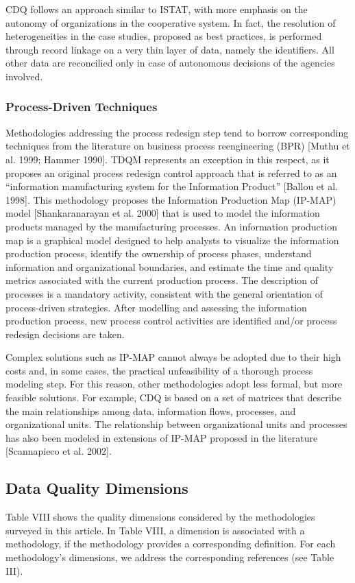\documentclass[pdftex,english,oribibl]{llncs}
\begin{document}
    CDQ follows an approach similar to ISTAT, with more emphasis on the autonomy of organizations in the cooperative system.
    In fact, the resolution of heterogeneities in the case studies, proposed as best practices, is performed through record linkage on a very thin layer of data, namely the identifiers.
    All other data are reconcilied only in case of autonomous decisions of the agencies involved.
    \subsubsection{Process-Driven Techniques}
    Methodologies addressing the process redesign step tend to borrow corresponding techniques from the literature on business process reengineering (BPR) [Muthu et al. 1999; Hammer 1990].
    TDQM represents an exception in this respect, as it proposes an original process redesign control approach that is referred to as an “information manufacturing system for the Information Product” [Ballou et al. 1998].
    This methodology proposes the Information Production Map (IP-MAP) model [Shankaranarayan et al. 2000] that is used to model the information products managed by the manufacturing processes.
    An information production map is a graphical model designed to help analysts to visualize the information production process, identify the ownership of process phases, understand information and organizational boundaries, and estimate the time and quality metrics associated with the current production process.
    The description of processes is a mandatory activity, consistent with the general orientation of process-driven strategies.
    After modelling and assessing the information production process, new process control activities are identified and/or process redesign decisions are taken.

    Complex solutions such as IP-MAP cannot always be adopted due to their high costs and, in some cases, the practical unfeasibility of a thorough process modeling step.
    For this reason, other methodologies adopt less formal, but more feasible solutions.
    For example, CDQ is based on a set of matrices that describe the main relationships among data, information flows, processes, and organizational units.
    The relationship between organizational units and processes has also been modeled in extensions of IP-MAP proposed in the literature [Scannapieco et al. 2002].

    \subsection{Data Quality Dimensions}
    Table VIII shows the quality dimensions considered by the methodologies surveyed in this article.
    In Table VIII, a dimension is associated with a methodology, if the methodology provides a corresponding definition.
    For each methodology’s dimensions, we address the corresponding references (see Table III).
\end{document}
